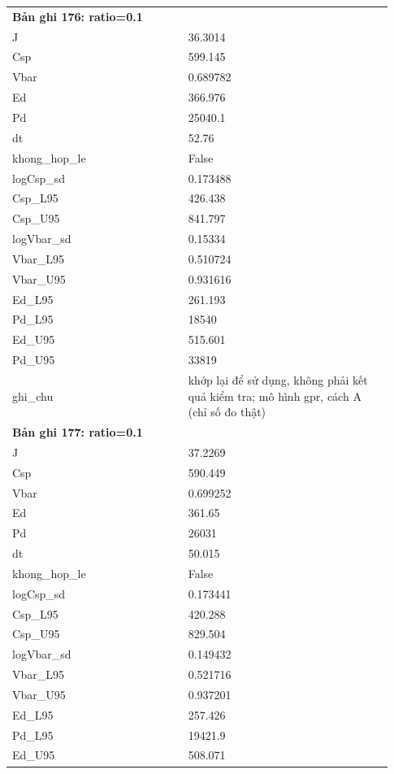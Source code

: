 \begin{longtable}{p{0.43\linewidth}p{0.50\linewidth}}
\midrule
\multicolumn{2}{p{0.95\linewidth}}{\textbf{Bản ghi 176: ratio=0.1}} \\
J & 36.3014 \\
Csp & 599.145 \\
Vbar & 0.689782 \\
Ed & 366.976 \\
Pd & 25040.1 \\
dt & 52.76 \\
khong\_\allowbreak hop\_\allowbreak le & False \\
logCsp\_\allowbreak sd & 0.173488 \\
Csp\_\allowbreak L95 & 426.438 \\
Csp\_\allowbreak U95 & 841.797 \\
logVbar\_\allowbreak sd & 0.15334 \\
Vbar\_\allowbreak L95 & 0.510724 \\
Vbar\_\allowbreak U95 & 0.931616 \\
Ed\_\allowbreak L95 & 261.193 \\
Pd\_\allowbreak L95 & 18540 \\
Ed\_\allowbreak U95 & 515.601 \\
Pd\_\allowbreak U95 & 33819 \\
ghi\_\allowbreak chu & khớp lại để sử dụng, không phải kết quả kiểm tra; mô hình gpr, cách A (chỉ số đo thật) \\
\midrule
\multicolumn{2}{p{0.95\linewidth}}{\textbf{Bản ghi 177: ratio=0.1}} \\
J & 37.2269 \\
Csp & 590.449 \\
Vbar & 0.699252 \\
Ed & 361.65 \\
Pd & 26031 \\
dt & 50.015 \\
khong\_\allowbreak hop\_\allowbreak le & False \\
logCsp\_\allowbreak sd & 0.173441 \\
Csp\_\allowbreak L95 & 420.288 \\
Csp\_\allowbreak U95 & 829.504 \\
logVbar\_\allowbreak sd & 0.149432 \\
Vbar\_\allowbreak L95 & 0.521716 \\
Vbar\_\allowbreak U95 & 0.937201 \\
Ed\_\allowbreak L95 & 257.426 \\
Pd\_\allowbreak L95 & 19421.9 \\
Ed\_\allowbreak U95 & 508.071 \\

\end{longtable}
